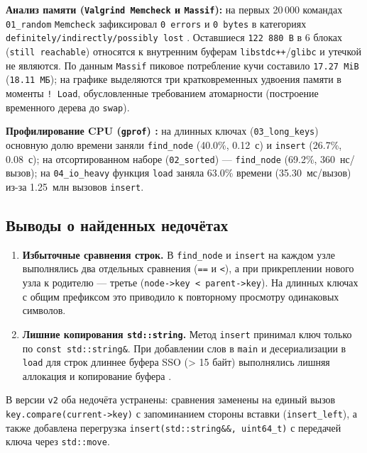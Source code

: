 \textbf{Анализ памяти (\texttt{Valgrind Memcheck} и \texttt{Massif}):} на первых 20\,000 командах \texttt{01\_random} \texttt{Memcheck} зафиксировал \texttt{0 errors} и \texttt{0 bytes} в категориях \texttt{definitely/indirectly/possibly lost} \cite{Valgrind}. Оставшиеся \texttt{122\,880 B} в 6 блоках (\texttt{still reachable}) относятся к внутренним буферам \texttt{libstdc++}/\texttt{glibc} и утечкой не являются. По данным \texttt{Massif} пиковое потребление кучи составило \texttt{17.27 MiB} (\texttt{18.11 МБ}); на графике выделяются три кратковременных удвоения памяти в моменты \texttt{! Load}, обусловленные требованием атомарности (построение временного дерева до \texttt{swap}).

\textbf{Профилирование CPU (\texttt{gprof}) \cite{Gprof}:} на длинных ключах (\texttt{03\_long\_keys}) основную долю времени заняли \texttt{find\_node} (40.0\%, 0.12~с) и \texttt{insert} (26.7\%, 0.08~с); на отсортированном наборе (\texttt{02\_sorted}) --- \texttt{find\_node} (69.2\%, 360~нс/вызов); на \texttt{04\_io\_heavy} функция \texttt{load} заняла 63.0\% времени (35.30~мс/вызов) из-за 1.25~млн вызовов \texttt{insert}.

\subsection{Выводы о найденных недочётах}
\begin{enumerate}
    \item \textbf{Избыточные сравнения строк.} В \texttt{find\_node} и \texttt{insert} на каждом узле выполнялись два отдельных сравнения (\texttt{==} и \texttt{<}), а при прикреплении нового узла к родителю --- третье (\texttt{node->key < parent->key}). На длинных ключах с общим префиксом это приводило к повторному просмотру одинаковых символов.
    \item \textbf{Лишние копирования \texttt{std::string}.} Метод \texttt{insert} принимал ключ только по \texttt{const std::string\&}. При добавлении слов в \texttt{main} и десериализации в \texttt{load} для строк длиннее буфера SSO (> 15 байт) выполнялись лишняя аллокация и копирование буфера \cite{CppRef}.
\end{enumerate}

В версии \texttt{v2} оба недочёта устранены: сравнения заменены на единый вызов \texttt{key.compare(current->key)} с запоминанием стороны вставки (\texttt{insert\_left}), а также добавлена перегрузка \texttt{insert(std::string\&\&, uint64\_t)} с передачей ключа через \texttt{std::move}.

